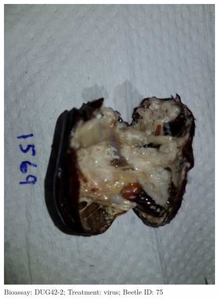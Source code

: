 \documentclass[11pt]{scrartcl}
\begin{document}
\begin{figure}[h!]
    \centering
    \includegraphics[width=\linewidth, height=\textheight, keepaspectratio]{uploads/btl.pm_image.90077d26c55c5b23.447567343220313536395f5265702d32202076697275732e6a7067.jpg}
    \caption{Bioassay: DUG42-2; Treatment: virus; Beetle ID: 75}
\end{figure}
\clearpage
\end{document}

